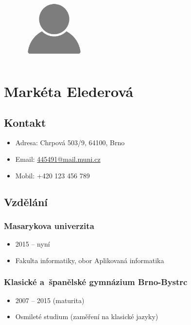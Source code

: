 \documentclass[a4paper,12pt,oneside]{article}
\begin{document}
\begin{figure}
       \begin{center}
            \includegraphics[width=0.30\textwidth]{portret}
        \end{center}
\end{figure}

{\section*{Markéta Elederová}

\subsection*{Kontakt}
\begin{itemize}[label={}]
\item Adresa: Chrpová 503/9, 64100, Brno 
\item Email: \href{mailto:445491@mail.muni.cz}{445491@mail.muni.cz}
\item Mobil: +420 123 456 789
\end{itemize}
 
\subsection*{Vzdělání}
\subsubsection*{Masarykova univerzita}
\begin{itemize}[label={}]
\item 2015 – nyní
\item Fakulta informatiky, obor Aplikovaná informatika
\end{itemize}
\subsubsection*{Klasické a~španělské gymnázium Brno-Bystrc}
\begin{itemize}[label={}]
\item 2007 – 2015 (maturita)
\item Osmileté studium (zaměření na klasické jazyky)
\end{itemize}

}
\end{document}

